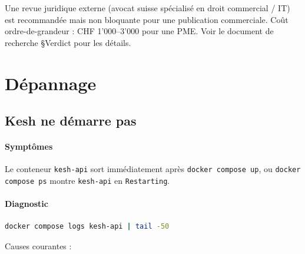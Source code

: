 \documentclass[a4paper,11pt,oneside]{article}
\begin{document}
\begin{keshtip}
Une revue juridique externe (avocat suisse spécialisé en droit commercial / IT) est recommandée mais non bloquante pour une publication commerciale. Coût ordre-de-grandeur : CHF 1'000--3'000 pour une PME. Voir le document de recherche §Verdict pour les détails.
\end{keshtip}

\section{Dépannage}

\subsection{Kesh ne démarre pas}

\paragraph{Symptômes} Le conteneur \texttt{kesh-api} sort immédiatement après \texttt{docker compose up}, ou \texttt{docker compose ps} montre \texttt{kesh-api} en \texttt{Restarting}.

\paragraph{Diagnostic}

\begin{lstlisting}[language=bash]
docker compose logs kesh-api | tail -50
\end{lstlisting}

Causes courantes :
\end{document}
